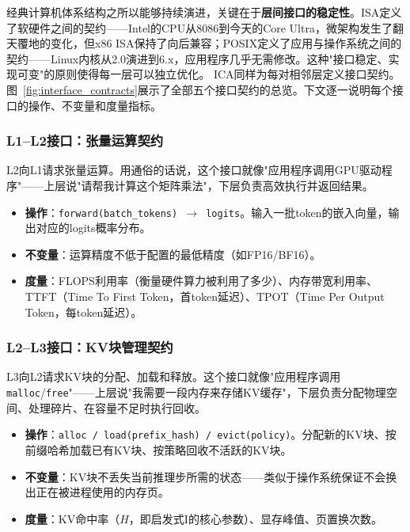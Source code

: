 经典计算机体系结构之所以能够持续演进，关键在于\textbf{层间接口的稳定性}。ISA定义了软硬件之间的契约——Intel的CPU从8086到今天的Core Ultra，微架构发生了翻天覆地的变化，但x86 ISA保持了向后兼容；POSIX定义了应用与操作系统之间的契约——Linux内核从2.0演进到6.x，应用程序几乎无需修改。这种"接口稳定、实现可变"的原则使得每一层可以独立优化。
ICA同样为每对相邻层定义接口契约。图~\ref{fig:interface_contracts}展示了全部五个接口契约的总览。下文逐一说明每个接口的操作、不变量和度量指标。



\subsubsection{L1--L2接口：张量运算契约}

L2向L1请求张量运算。用通俗的话说，这个接口就像"应用程序调用GPU驱动程序"——上层说"请帮我计算这个矩阵乘法"，下层负责高效执行并返回结果。

\begin{itemize}[nosep]
\item \textbf{操作}：\texttt{forward(batch\_tokens) $\to$ logits}。输入一批token的嵌入向量，输出对应的logits概率分布。
\item \textbf{不变量}：运算精度不低于配置的最低精度（如FP16/BF16）。
\item \textbf{度量}：FLOPS利用率（衡量硬件算力被利用了多少）、内存带宽利用率、TTFT（Time To First Token，首token延迟）、TPOT（Time Per Output Token，每token延迟）。
\end{itemize}

\subsubsection{L2--L3接口：KV块管理契约}

L3向L2请求KV块的分配、加载和释放。这个接口就像"应用程序调用\texttt{malloc}/\texttt{free}"——上层说"我需要一段内存来存储KV缓存"，下层负责分配物理空间、处理碎片、在容量不足时执行回收。

\begin{itemize}[nosep]
\item \textbf{操作}：\texttt{alloc / load(prefix\_hash) / evict(policy)}。分配新的KV块、按前缀哈希加载已有KV块、按策略回收不活跃的KV块。
\item \textbf{不变量}：KV块不丢失当前推理步所需的状态——类似于操作系统保证不会换出正在被进程使用的内存页。
\item \textbf{度量}：KV命中率（$H$，即启发式I的核心参数）、显存峰值、页置换次数。
\end{itemize}

